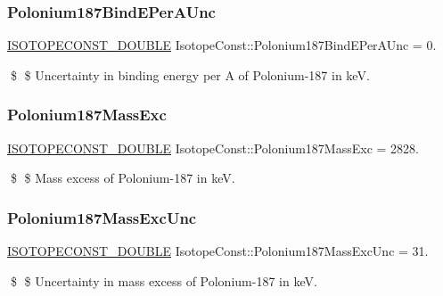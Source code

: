 \subsubsection{\texorpdfstring{Polonium187\+Bind\+E\+Per\+A\+Unc}{Polonium187BindEPerAUnc}}
{\footnotesize\ttfamily \mbox{\hyperlink{group___isotope_const-_macros_ga8f45a7272ce02c0b4c65c44636ed719a}{I\+S\+O\+T\+O\+P\+E\+C\+O\+N\+S\+T\+\_\+\+D\+O\+U\+B\+LE}} Isotope\+Const\+::\+Polonium187\+Bind\+E\+Per\+A\+Unc = 0.}

\$ \$ Uncertainty in binding energy per A of Polonium-\/187 in keV. \mbox{\label{group___isotope_const-_polonium-_po187_ga10f69cef83d06cd4bea214cc7f3008cd}} 
\subsubsection{\texorpdfstring{Polonium187\+Mass\+Exc}{Polonium187MassExc}}
{\footnotesize\ttfamily \mbox{\hyperlink{group___isotope_const-_macros_ga8f45a7272ce02c0b4c65c44636ed719a}{I\+S\+O\+T\+O\+P\+E\+C\+O\+N\+S\+T\+\_\+\+D\+O\+U\+B\+LE}} Isotope\+Const\+::\+Polonium187\+Mass\+Exc = 2828.}

\$ \$ Mass excess of Polonium-\/187 in keV. \mbox{\label{group___isotope_const-_polonium-_po187_ga6bb04c2dffa986ab2520fb22fd162505}} 
\subsubsection{\texorpdfstring{Polonium187\+Mass\+Exc\+Unc}{Polonium187MassExcUnc}}
{\footnotesize\ttfamily \mbox{\hyperlink{group___isotope_const-_macros_ga8f45a7272ce02c0b4c65c44636ed719a}{I\+S\+O\+T\+O\+P\+E\+C\+O\+N\+S\+T\+\_\+\+D\+O\+U\+B\+LE}} Isotope\+Const\+::\+Polonium187\+Mass\+Exc\+Unc = 31.}

\$ \$ Uncertainty in mass excess of Polonium-\/187 in keV. \mbox{\label{group___isotope_const-_polonium-_po187_gaa0d74c81b86a56fd993395dfdd2bc192}} 
